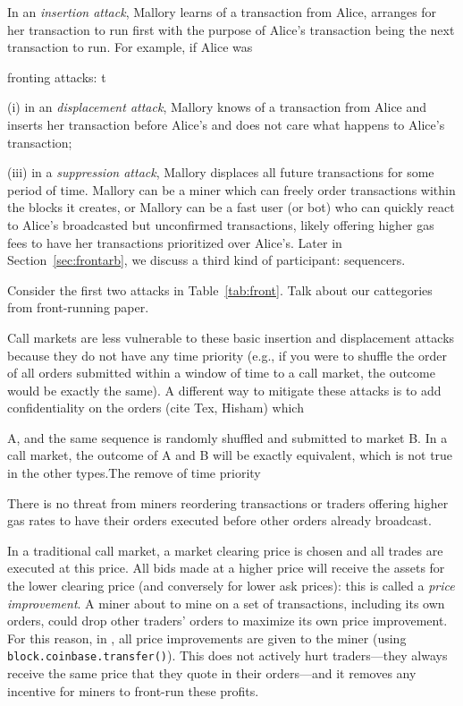 In an \emph{insertion attack}, Mallory learns of a transaction from Alice, arranges for her transaction to run first with the purpose of Alice's transaction being the next transaction to run. For example, if Alice was 


 fronting attacks: 
t


(i) in an \emph{displacement attack}, Mallory knows of a transaction from Alice and inserts her transaction before Alice's and does not care what happens to Alice's transaction; 



(iii) in a \emph{suppression attack}, Mallory displaces all future transactions for some period of time. Mallory can be a miner which can freely order transactions within the blocks it creates, or Mallory can be a fast user (or bot) who can quickly react to Alice's broadcasted but unconfirmed transactions, likely offering higher gas fees to have her transactions prioritized over Alice's. Later in Section~\ref{sec:frontarb}, we discuss a third kind of participant: sequencers. 

Consider the first two attacks in Table~\ref{tab:front}. Talk about our cattegories from front-running paper.

 Call markets are less vulnerable to these basic insertion and displacement attacks because they do not have any time priority (e.g., if you were to shuffle the order of all orders submitted within a window of time to a call market, the outcome would be exactly the same). A different way to mitigate these attacks is to add confidentiality on the orders (cite Tex, Hisham) which 

 A, and the same sequence is randomly shuffled and submitted to market B. In a call market, the outcome of A and B will be exactly equivalent, which is not true in the other types.The remove of time priority 




 There is no threat from miners reordering transactions or traders offering higher gas rates to have their orders executed before other orders already broadcast. 

In a traditional call market, a market clearing price is chosen and all trades are executed at this price. All bids made at a higher price will receive the assets for the lower clearing price (and conversely for lower ask prices): this is called a \textit{price improvement}. A miner about to mine on a set of transactions, including its own orders, could drop other traders' orders to maximize its own price improvement. For this reason, in \cm, all price improvements are given to the miner (using \texttt{block.coinbase.transfer()}). This does not actively hurt traders---they always receive the same price that they quote in their orders---and it removes any incentive for miners to front-run these profits. 

